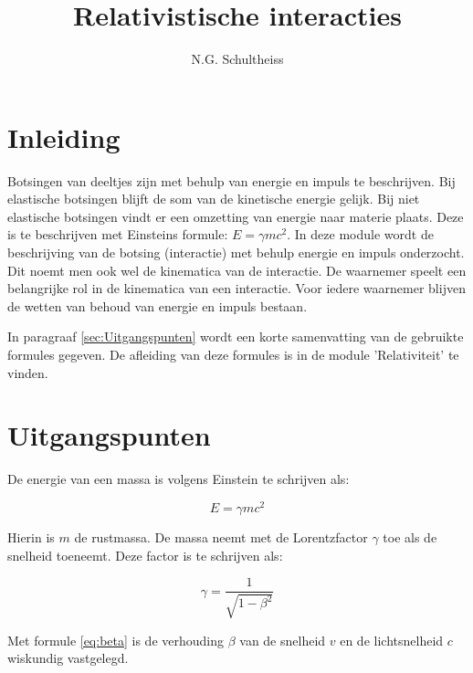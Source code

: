 
\usepackage{multicol}



\title{Relativistische interacties}
\author{N.G. Schultheiss}

\maketitle
\thispagestyle{firststyle}

\section{Inleiding}

Botsingen van deeltjes zijn met behulp van energie en impuls te beschrijven. 
Bij elastische botsingen blijft de som van de kinetische energie gelijk. Bij niet 
elastische botsingen vindt er een omzetting van energie naar materie plaats. 
Deze is te beschrijven met Einsteins formule: $E=\gamma mc^{2}$. In deze 
module wordt de beschrijving van de botsing (interactie) met behulp energie 
en impuls onderzocht. Dit noemt men ook wel de kinematica van de interactie. 
De waarnemer speelt een belangrijke rol in de kinematica van een interactie. 
Voor iedere waarnemer blijven de wetten van behoud van energie en impuls bestaan.


In paragraaf \ref{sec:Uitgangspunten} wordt een korte samenvatting
van de gebruikte formules gegeven. De afleiding van deze formules is in de 
module 'Relativiteit' te vinden. 

\section{\label{sec:Uitgangspunten}Uitgangspunten}

De energie van een massa is volgens Einstein te schrijven als:

\begin{equation}
E=\gamma mc^{2}\label{eq:Einstein}
\end{equation}


Hierin is $m$ de rustmassa. De massa neemt met de Lorentzfactor $\gamma$
toe als de snelheid toeneemt. Deze factor is te schrijven als: 

\begin{equation}
\gamma=\frac{1}{\sqrt{1-\beta^{2}}}
\end{equation}

Met formule \ref{eq:beta} is de verhouding $\beta$ van de snelheid
$v$ en de lichtsnelheid $c$ wiskundig vastgelegd.

